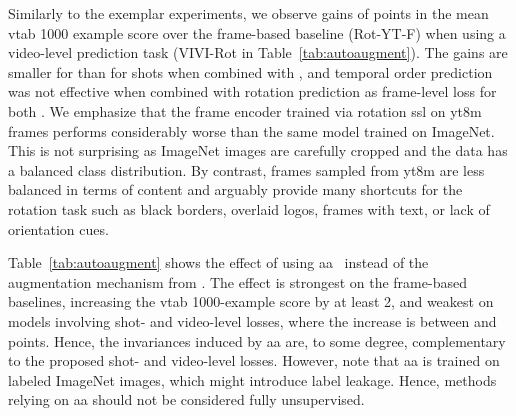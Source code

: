 \documentclass[10pt,twocolumn,letterpaper]{article}
\renewcommand{\paragraph}[1]{\noindent{\bf #1}\quad}
\begin{document}
{\vspace{1mm}
\paragraph{Rotation}
Similarly to the exemplar experiments, we observe gains of  points in the mean \gls{vtab} 1000 example score over the frame-based baseline (Rot-YT-F) when using a video-level prediction task (VIVI-Rot in Table~\ref{tab:autoaugment}). The gains are smaller for  than for  shots when combined with , and temporal order prediction was not effective when combined with rotation prediction as frame-level loss for both . We emphasize that the frame encoder trained via rotation \gls{ssl} on \gls{yt8m} frames performs considerably worse than the same model trained on ImageNet. This is not surprising as ImageNet images are carefully cropped and the data has a balanced class distribution. By contrast, frames sampled from \gls{yt8m} are less balanced in terms of content and arguably provide many shortcuts for the rotation task such as black borders, overlaid logos, frames with text, or lack of orientation cues.

\paragraph{Effect of AutoAugment (AA)} Table~\ref{tab:autoaugment} shows the effect of using \gls{aa}~\cite{cubuk2018autoaugment} instead of the augmentation mechanism from \cite{szegedy2015going}. The effect is strongest on the frame-based baselines, increasing the \gls{vtab} 1000-example score by at least 2, and weakest on models involving shot- and video-level losses, where the increase is between  and  points. Hence, the invariances induced by \gls{aa} are, to some degree, complementary to the proposed shot- and video-level losses. However, note that \gls{aa} is trained on labeled ImageNet images, which might introduce label leakage.
Hence, methods relying on \gls{aa} should not be considered fully unsupervised.

}
\end{document}
